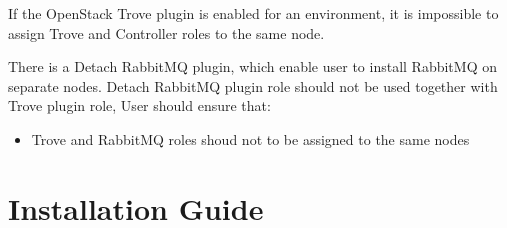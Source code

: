 \documentclass[letterpaper,10pt,english]{sphinxmanual}
\begin{document}
If the OpenStack Trove plugin is enabled for an environment, it is impossible
to assign Trove and Controller roles to the same node.

There is a Detach RabbitMQ plugin, which enable user to install RabbitMQ
on separate nodes. Detach RabbitMQ plugin role should not be used together
with Trove plugin role, User should ensure that:
\begin{itemize}
\item {} 
Trove and RabbitMQ roles shoud not to be assigned to the same nodes

\end{itemize}


\chapter{Installation Guide}
\end{document}
